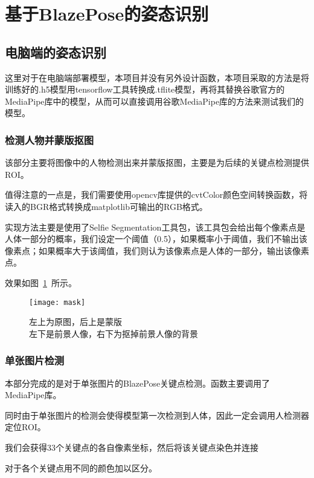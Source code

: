 \section{基于BlazePose的姿态识别}

\subsection{电脑端的姿态识别}
这里对于在电脑端部署模型，本项目并没有另外设计函数，本项目采取的方法是将训练好的.h5模型用tensorflow工具转换成.tflite模型，再将其替换谷歌官方的MediaPipe库中的模型，从而可以直接调用谷歌MediaPipe库的方法来测试我们的模型。

\subsubsection{检测人物并蒙版抠图}
该部分主要将图像中的人物检测出来并蒙版抠图，主要是为后续的关键点检测提供ROI。

值得注意的一点是，我们需要使用opencv库提供的cvtColor颜色空间转换函数，将读入的BGR格式转换成matplotlib可输出的RGB格式。

实现方法主要是使用了Selfie Segmentation工具包，该工具包会给出每个像素点是人体一部分的概率，我们设定一个阈值（0.5），如果概率小于阈值，我们不输出该像素点；如果概率大于该阈值，我们则认为该像素点是人体的一部分，输出该像素点。

效果如图~\ref{picture:17}~所示。

\begin{figure}
\centering
\texttt{[image: mask]}
\caption{左上为原图，后上是蒙版\\左下是前景人像，右下为抠掉前景人像的背景}
\label{picture:17}
\end{figure}

\subsubsection{单张图片检测}
本部分完成的是对于单张图片的BlazePose关键点检测。函数主要调用了MediaPipe库。

同时由于单张图片的检测会使得模型第一次检测到人体，因此一定会调用人检测器定位ROI。

我们会获得33个关键点的各自像素坐标，然后将该关键点染色并连接

对于各个关键点用不同的颜色加以区分。

